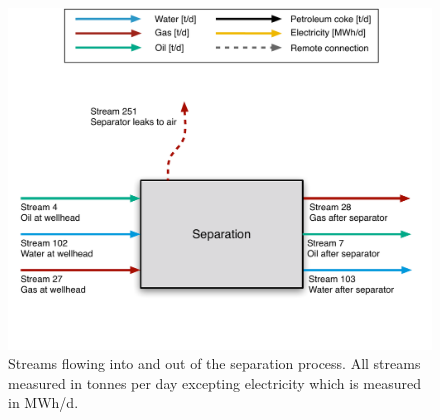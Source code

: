 \documentclass[11pt]{report}
\begin{document}
\begin{figure}
\includegraphics[width=0.85\columnwidth]{images/Separation_PF.pdf}
\caption{Streams flowing into and out of the separation process. All streams measured in tonnes per day excepting electricity which is measured in MWh/d.}
\label{fig:separation_PF}
\end{figure}
\end{document}
